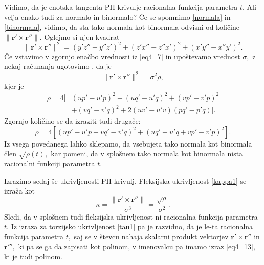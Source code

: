 \documentclass[12pt,a4paper,twoside]{article}
\theoremstyle{definition} %
\theoremstyle{plain} %
\numberwithin{equation}{section}  %
\begin{document}
Vidimo, da je enotska tangenta PH krivulje racionalna funkcija parametra $t.$ Ali velja enako tudi za normalo in binormalo? Če se spomnimo \eqref{normala} in \eqref{binormala}, vidimo, da sta tako normala kot binormala odvisni od količine $\lVert \mathbf{r'} \times \mathbf{r''} \rVert.$ Oglejmo si njen kvadrat
\begin{equation}
	\lVert \mathbf{r'} \times \mathbf{r''} \rVert^2=(y'z''-y''z')^2+(z'x''-z''x')^2+(x'y''-x''y')^2.
\end{equation}
Če vstavimo v zgornjo enačbo vrednosti iz \eqref{eq4_7} in upoštevamo vrednost $\sigma,$ z nekaj računanja ugotovimo \cite{farouki2002exact}, da je
\begin{equation}
	\label{eq4_13}
	\lVert \mathbf{r'} \times \mathbf{r''} \rVert^2=\sigma^2\rho,
\end{equation}
kjer je
\begin{align}
	\rho=4[&(up'-u'p)^2+(uq'-u'q)^2+(vp'-v'p)^2 \nonumber \\
	&+(vq'-v'q)^2+2(uv'-u'v)(pq'-p'q)]. \label{rho1}
\end{align}
Zgornjo količino se da izraziti \cite{beltranmonterde} tudi drugače:
\begin{equation}
	\label{rho2}
	\rho=4[(up'-u'p+vq'-v'q)^2+(uq'-u'q+vp'-v'p)^2].
\end{equation}
Iz vsega povedanega lahko sklepamo, da vsebujeta tako normala kot binormala člen $\sqrt{\rho(t)},$ kar pomeni, da v splošnem tako normala kot binormala nista racionalni funkciji parametra $t.$

Izrazimo sedaj še ukrivljenosti PH krivulj. Fleksijska ukrivljenost \eqref{kappa1} se izraža kot
\begin{equation}
	\label{kappa2}
	\kappa=\frac{\lVert \mathbf{r'} \times \mathbf{r''} \rVert}{\sigma^3}=\frac{\sqrt{\rho}}{\sigma^2}.
\end{equation}
Sledi, da v splošnem tudi fleksijska ukrivljenost ni racionalna funkcija parametra $t.$ Iz izraza za torzijsko ukrivljenost \eqref{tau1} pa je razvidno, da je le-ta racionalna funkcija parametra $t,$ saj se v števcu nahaja skalarni produkt vektorjev $\mathbf{r'}\times \mathbf{r''}$ in $\mathbf{r'''},$ ki pa se ga da zapisati kot polinom, v imenovalcu pa imamo izraz \eqref{eq4_13}, ki je tudi polinom.
\end{document}
